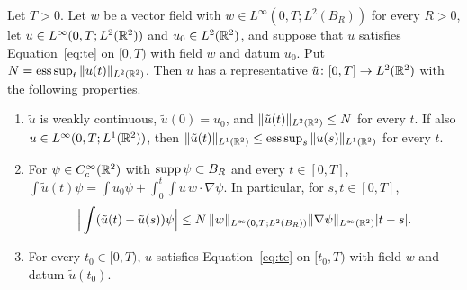 \begin{lemma}
\label{lem:weak-cont}
Let $T>0$. Let $w$ be a vector field
with $w\in L^\infty(0,T;L^2(B_R))$ for every $R>0$, let
$u\in L^\infty(0,T;L^2(\mathbb{R}^2))$ and $u_0\in L^2(\mathbb{R}^2)$, and suppose that
$u$ satisfies Equation~\eqref{eq:te} on $[0,T)$ with field $w$ and datum $u_0$.
Put $N=\operatorname{ess\,sup}_t\|u(t)\|_{L^2(\mathbb{R}^2)}$.
Then $u$ has a representative $\tilde u\colon[0,T]\to L^2(\mathbb{R}^2)$ with the following
properties.
\begin{enumerate}[label=\textup{(\alph*)}]
\item $\tilde u$ is weakly continuous, $\tilde u(0)=u_0$, and
  $\|\tilde u(t)\|_{L^2(\mathbb{R}^2)}\le N$ for every $t$. If also
  $u\in L^\infty(0,T;L^1(\mathbb{R}^2))$, then
  $\|\tilde u(t)\|_{L^1(\mathbb{R}^2)}\le\operatorname{ess\,sup}_s\|u(s)\|_{L^1(\mathbb{R}^2)}$ for every $t$.
\item For $\psi\in C_c^\infty(\mathbb{R}^2)$ with $\operatorname{supp}\psi\subset B_R$ and every
  $t\in[0,T]$,
  $\int\tilde u(t)\psi=\int u_0\psi+\int_0^t\!\int u\,w\cdot\nabla\psi$. In
  particular, for $s,t\in[0,T]$,
  \[
  \Big|\int(\tilde u(t)-\tilde u(s))\psi\Big|
  \le N\,\|w\|_{L^\infty(0,T;L^2(B_R))}\|\nabla\psi\|_{L^\infty(\mathbb{R}^2)}|t-s| .
  \]
\item For every $t_0\in[0,T)$, $u$ satisfies Equation~\eqref{eq:te} on $[t_0,T)$ with
  field $w$ and datum $\tilde u(t_0)$.
\end{enumerate}
\end{lemma}

